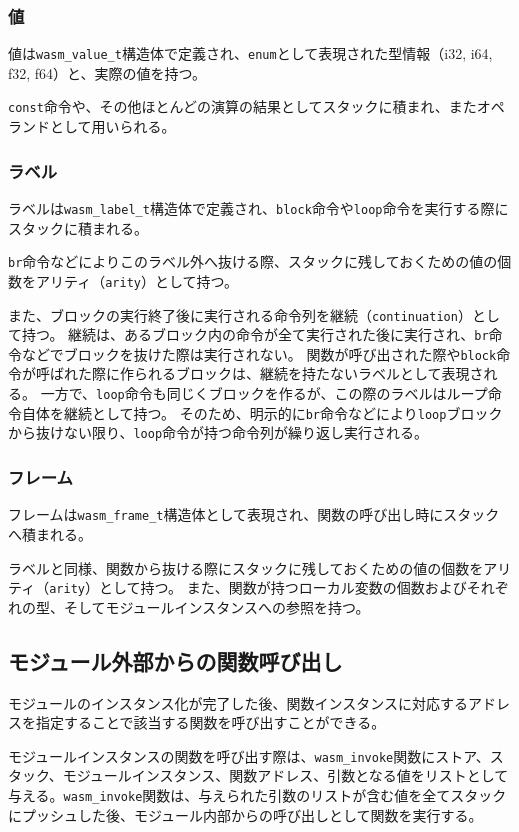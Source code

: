 \subsubsection{値}
値は\verb|wasm_value_t|構造体で定義され、{\tt enum}として表現された型情報（i32, i64, f32, f64）と、実際の値を持つ。

{\tt const}命令や、その他ほとんどの演算の結果としてスタックに積まれ、またオペランドとして用いられる。

\subsubsection{ラベル}
ラベルは\verb|wasm_label_t|構造体で定義され、{\tt block}命令や{\tt loop}命令を実行する際にスタックに積まれる。

{\tt br}命令などによりこのラベル外へ抜ける際、スタックに残しておくための値の個数をアリティ（{\tt arity}）として持つ。

また、ブロックの実行終了後に実行される命令列を継続（{\tt continuation}）として持つ。
継続は、あるブロック内の命令が全て実行された後に実行され、{\tt br}命令などでブロックを抜けた際は実行されない。
関数が呼び出された際や{\tt block}命令が呼ばれた際に作られるブロックは、継続を持たないラベルとして表現される。
一方で、{\tt loop}命令も同じくブロックを作るが、この際のラベルはループ命令自体を継続として持つ。
そのため、明示的に{\tt br}命令などにより{\tt loop}ブロックから抜けない限り、{\tt loop}命令が持つ命令列が繰り返し実行される。

\subsubsection{フレーム}
フレームは\verb|wasm_frame_t|構造体として表現され、関数の呼び出し時にスタックへ積まれる。

ラベルと同様、関数から抜ける際にスタックに残しておくための値の個数をアリティ（{\tt arity}）として持つ。
また、関数が持つローカル変数の個数およびそれぞれの型、そしてモジュールインスタンスへの参照を持つ。

\subsection{モジュール外部からの関数呼び出し}

モジュールのインスタンス化が完了した後、関数インスタンスに対応するアドレスを指定することで該当する関数を呼び出すことができる。

モジュールインスタンスの関数を呼び出す際は、\verb|wasm_invoke|関数にストア、スタック、モジュールインスタンス、関数アドレス、引数となる値をリストとして与える。\verb|wasm_invoke|関数は、与えられた引数のリストが含む値を全てスタックにプッシュした後、モジュール内部からの呼び出しとして関数を実行する。

